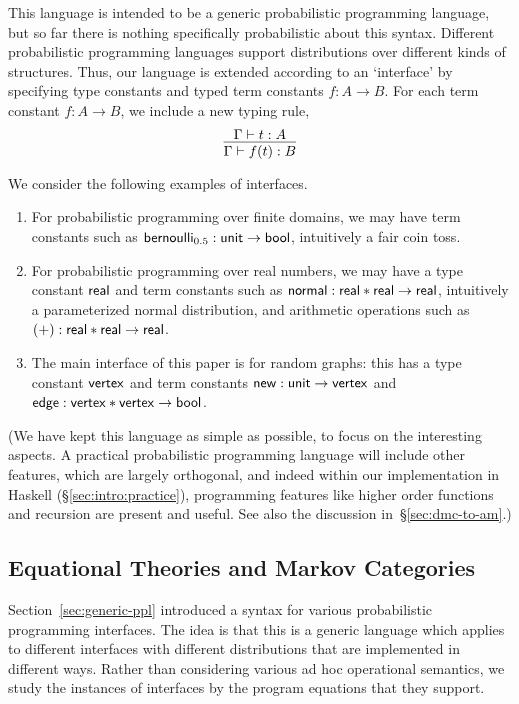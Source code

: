  This language is intended to be a generic probabilistic programming
  language, but so far there is nothing specifically probabilistic about this syntax.
  Different probabilistic programming languages support distributions
  over different kinds of structures. 
  Thus, our language is extended according to an `interface' by specifying
  type constants and typed term constants $f:A\to B$. For each term constant $f:A\to B$,
  we include a new typing rule,
 \[    \infer{\Gamma \vdash f(t) : B}
   {\Gamma \vdash t : A }\]
         \begin{example}\label{ex:interfaces}
           We consider the following examples of interfaces. 
  \begin{enumerate}
  \item For probabilistic programming over finite domains, we may have term constants such as
    $\mathsf{bernoulli}_{0.5}:\mathsf{unit} \to \mathsf{bool}$, intuitively a fair coin toss.
  \item For probabilistic programming over real numbers, we may have a type constant $\mathsf{real}$ and
    term constants such as $\mathsf{normal}:\mathsf{real}\ast\mathsf{real} \to\mathsf{real}$,
    intuitively a parameterized normal distribution,
    and arithmetic operations such as
    $(+):\mathsf{real}\ast\mathsf{real}\to\mathsf{real}$.
  \item The main interface of this paper is for random graphs: this
    has a type constant $\mathsf{vertex}$ and term constants $
    \mathsf{new}:\mathsf{unit}\to \mathsf{vertex}$ and $\mathsf{edge}:\mathsf{vertex}\ast \mathsf{vertex} \to \mathsf{bool}$. 
\end{enumerate}\end{example}
 (We have kept this language as simple as possible, to focus on the interesting aspects.
 A practical probabilistic programming language will include other features, which are largely orthogonal,
 and indeed within our implementation in Haskell (\S\ref{sec:intro:practice}), programming features like higher order functions and recursion are
 present and useful. See also the discussion in~\S\ref{sec:dmc-to-am}.)

\subsection{Equational Theories and Markov Categories}
\label{sec:markov-cats}
Section~\ref{sec:generic-ppl} introduced a syntax for various probabilistic programming interfaces. 
The idea is that this is a generic language which applies to different
interfaces with different distributions that are implemented in
different ways. Rather than considering various ad hoc operational
semantics, we study the instances of interfaces by the program equations
that they support.

